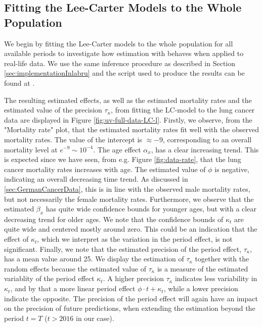 \subsection{Fitting the Lee-Carter Models to the Whole Population}
\label{sec:LC-full-data}
We begin by fitting the Lee-Carter models to the whole population for all available periods to investigate how estimation with \inlabru behaves when applied to real-life data. We use the same inference procedure as described in Section \ref{sec:implementationInlabru} and the script used to produce the results can be found at 
.

\newpar The resulting estimated effects, as well as the estimated mortality rates and the estimated value of the precision $\tau_\kappa$, from fitting the LC-model to the lung cancer data are displayed in Figure \ref{fig:uv-full-data-LC-l}. Firstly, we observe, from the "Mortality rate" plot, that the estimated mortality rates fit well with the observed mortality rates. The value of the intercept is $\approx -9$, corresponding to an overall mortality level at $e^{-9} \sim 10^{-4}$. The age effect $\alpha_x$, has a clear increasing trend. This is expected since we have seen, from e.g. Figure \ref{fig:data-rate}, that the lung cancer mortality rates increases with age. The estimated value of $\phi$ is negative, indicating an overall decreasing time trend. As discussed in \ref{sec:GermanCancerData}, this is in line with the observed male mortality rates, but not necessarily the female mortality rates. Furthermore, we observe that the estimated $\beta_x$ has quite wide confidence bounds for younger ages, but with a clear decreasing trend for older ages. We note that the confidence bounds of $\kappa_t$ are quite wide and centered mostly around zero. This could be an indication that the effect of $\kappa_t$, which we interpret as the variation in the period effect, is not significant. Finally, we note that the estimated precision of the period effect, $\tau_\kappa$, has a mean value around 25. We display the estimation of $\tau_\kappa$ together with the random effects because the estimated value of $\tau_\kappa$ is a measure of the estimated variablity of the period effect $\kappa_t$. A higher precision $\tau_\kappa$ indicates less variability in $\kappa_t$, and by that a more linear period effect $\phi\cdot t + \kappa_t$, while a lower precision indicate the opposite. The precision of the period effect will again have an impact on the precision of future predictions, when extending the estimation beyond the period $t = T$ ($t > 2016$ in our case). 

